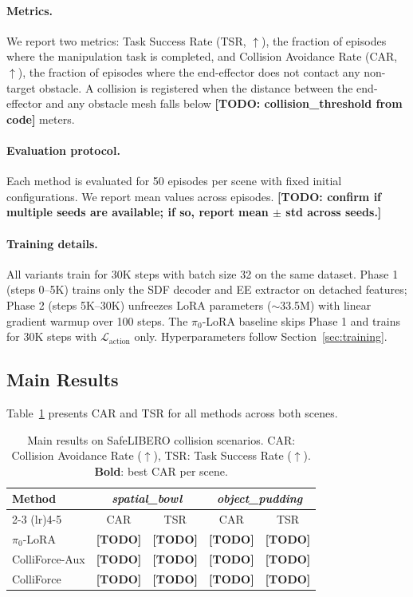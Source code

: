 \paragraph{Metrics.} We report two metrics: Task Success Rate (TSR, $\uparrow$), the fraction of episodes where the manipulation task is completed, and Collision Avoidance Rate (CAR, $\uparrow$), the fraction of episodes where the end-effector does not contact any non-target obstacle. A collision is registered when the distance between the end-effector and any obstacle mesh falls below \textbf{[TODO: collision\_threshold from code]} meters.

\paragraph{Evaluation protocol.} Each method is evaluated for 50 episodes per scene with fixed initial configurations. We report mean values across episodes. \textbf{[TODO: confirm if multiple seeds are available; if so, report mean $\pm$ std across seeds.]}

\paragraph{Training details.} All variants train for 30K steps with batch size 32 on the same dataset. Phase 1 (steps 0--5K) trains only the SDF decoder and EE extractor on detached features; Phase 2 (steps 5K--30K) unfreezes LoRA parameters (${\sim}$33.5M) with linear gradient warmup over 100 steps. The $\pi_0$-LoRA baseline skips Phase 1 and trains for 30K steps with $\mathcal{L}_\mathrm{action}$ only. Hyperparameters follow Section~\ref{sec:training}.

\subsection{Main Results}\label{sec:main_results}

Table~\ref{tab:main_results} presents CAR and TSR for all methods across both scenes.

\begin{table}[t]
\centering
\caption{Main results on SafeLIBERO collision scenarios. CAR: Collision Avoidance Rate ($\uparrow$), TSR: Task Success Rate ($\uparrow$). \textbf{Bold}: best CAR per scene.}
\label{tab:main_results}
\begin{tabular}{lcccc}
\toprule
\multirow{2}{*}{Method} & \multicolumn{2}{c}{\textit{spatial\_bowl}} & \multicolumn{2}{c}{\textit{object\_pudding}} \\
\cmidrule(lr){2-3} \cmidrule(lr){4-5}
& CAR & TSR & CAR & TSR \\
\midrule
$\pi_0$-LoRA & \textbf{[TODO]} & \textbf{[TODO]} & \textbf{[TODO]} & \textbf{[TODO]} \\
ColliForce-Aux & \textbf{[TODO]} & \textbf{[TODO]} & \textbf{[TODO]} & \textbf{[TODO]} \\
ColliForce & \textbf{[TODO]} & \textbf{[TODO]} & \textbf{[TODO]} & \textbf{[TODO]} \\
\bottomrule
\end{tabular}
\end{table}

